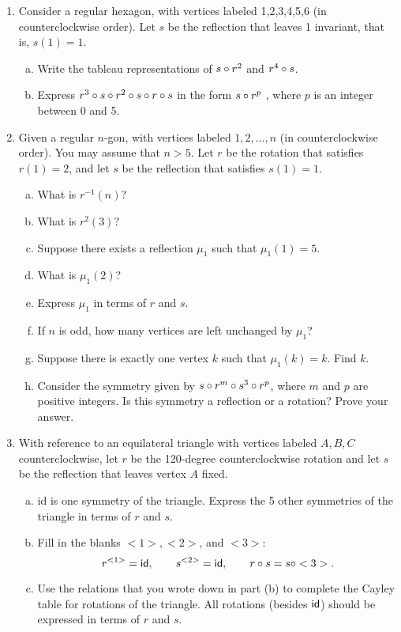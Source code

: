 \begin{enumerate}

\item
Consider a regular hexagon, with vertices labeled 1,2,3,4,5,6 (in counterclockwise order). Let $s$ be the reflection that  leaves 1 invariant, that is, $s(1) = 1$.
\begin{enumerate}[(a)]
\item
Write the tableau representations of $s \circ r^2$ and $ r^4 \circ s$.
\item
Express $r^3 \circ  s \circ  r^2 \circ  s \circ  r\circ s$ in the form $s \circ r^p$ , where $p$ is an integer between 0 and 5.
\end{enumerate}

\item
Given a regular $n$-gon, with vertices labeled $1,2,\ldots,n$ (in counterclockwise order).  You may assume that $n>5$. Let $r$ be the rotation that satisfies $r(1)=2$, and let $s$ be the reflection that satisfies $s(1)=1$.
\begin{enumerate}[(a)]
\item
What is $r^{-1}(n)$?
\item
What is $r^2(3)$?  
\item
Suppose there exists a reflection $\mu_1$ such that $\mu_1(1)=5$. 
\item
What is  $\mu_1(2)$?
\item  
Express $\mu_1$ in terms of $r$ and $s$.
\item
If $n$ is odd, how many vertices are left unchanged by $\mu_1$?
\item 
Suppose there is exactly one vertex $k$ such that  $\mu_1(k)=k$.  Find $k$.
\item 
Consider the symmetry given by $s \circ r^m \circ s^3 \circ r^p$, where $m$ and $p$ are positive integers. Is this symmetry a reflection or a rotation?  Prove your answer. 
\end{enumerate}

\item
With reference to an equilateral triangle with vertices labeled $A,B,C$ counterclockwise, let $r$ be the 120-degree counterclockwise rotation and let $s$ be the reflection that leaves vertex $A$ fixed. 
\begin{enumerate}[(a)]
\item
{\var id} is one symmetry of the triangle. Express the 5 other symmetries of the triangle in terms of $r$ and $s$.  
\item
Fill in the blanks $<1>,  <2>$, and $<3>$: 
\[r^{<1>} = {\sf{i}d}, \qquad s^{<2>} = {\sf{i}d},\qquad  r \circ s = s \circ <3>. \]
\item
Use the relations that you wrote down in part (b) to complete the Cayley table for rotations of the triangle.  All rotations (besides ${\sf{i}d}$) should be expressed in terms of $r$ and $s$.
\end{enumerate}


\end{enumerate}

